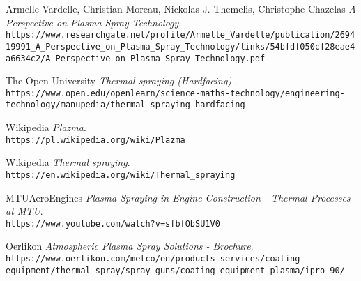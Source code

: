 \documentclass[13pt]{article}
\begin{document}
\begin{thebibliography}{9}
Armelle Vardelle, Christian Moreau, Nickolas J. Themelis, Christophe Chazelas
\textit{A Perspective on Plasma Spray Technology}. 
\\\texttt{https://www.researchgate.net/profile/Armelle\_Vardelle/publication/269419991\_A\_Perspective\_on\_Plasma\_Spray\_Technology/links/54bfdf050cf28eae4a6634c2/A-Perspective-on-Plasma-Spray-Technology.pdf}

The Open University
\textit{Thermal spraying (Hardfacing) }. 
\\\texttt{https://www.open.edu/openlearn/science-maths-technology/engineering-technology/manupedia/thermal-spraying-hardfacing}

Wikipedia
\textit{Plazma}. 
\\\texttt{https://pl.wikipedia.org/wiki/Plazma}

Wikipedia
\textit{Thermal spraying}. 
\\\texttt{https://en.wikipedia.org/wiki/Thermal\_spraying}

MTUAeroEngines
\textit{Plasma Spraying in Engine Construction - Thermal Processes at MTU}. 
\\\texttt{https://www.youtube.com/watch?v=sfbfObSU1V0}

Oerlikon
\textit{Atmospheric Plasma Spray Solutions - Brochure}. 
\\\texttt{https://www.oerlikon.com/metco/en/products-services/coating-equipment/thermal-spray/spray-guns/coating-equipment-plasma/ipro-90/}
\end{thebibliography}
\end{document}
